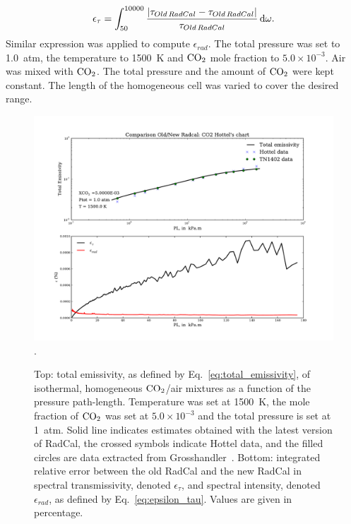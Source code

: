 \begin{equation}\label{eq:epsilon_tau}
 \epsilon_{\tau} = \displaystyle\int_{50}^{10000} \displaystyle\frac{|\tau_{Old\,RadCal}-\tau_{Old\,RadCal}|}{\tau_{Old\,RadCal}}{\,\mathrm{d} \omega}.
\end{equation}
Similar expression was applied to compute $\epsilon_{rad}$. The total pressure was set to 1.0~atm, the temperature to 1500~K and $\rm CO_2$ mole fraction to $5.0 \times 10^{-3}$. Air was mixed with ${\rm CO_2}$. The total pressure and the amount of ${\rm CO_2}$ were kept constant. The length of the homogeneous cell was varied to cover the desired range.

\begin{figure}
\includegraphics[width=\textwidth]{Figures/Test1_CO2_Hottel.pdf}.
\caption{Top: total emissivity, as defined by Eq.~\ref{eq:total_emissivity}, of isothermal, homogeneous ${\rm CO_2}$/air mixtures as a function of the pressure path-length. Temperature was set at 1500~K, the mole fraction of ${\rm CO_2}$ was set at $5.0\times10^{-3}$ and the total pressure is set at 1~atm. Solid line indicates estimates obtained with the latest version of RadCal, the crossed symbols indicate Hottel data, and the filled circles are data extracted from Grosshandler~\cite{Grosshandler1993}.
Bottom: integrated relative error between the old RadCal and the new RadCal in spectral transmissivity, denoted $\epsilon_{\tau}$, and spectral intensity, denoted $\epsilon_{rad}$, as defined by Eq.~\ref{eq:epsilon_tau}. Values are given in percentage.\label{fig:Test1_CO2_Hottel}}
\end{figure}

